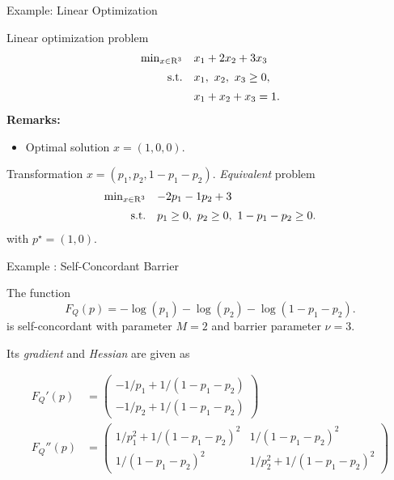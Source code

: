 \documentclass[9pt]{beamer}
\begin{document}
\begin{frame}{Example: Linear Optimization}

  Linear optimization problem
  \[
    \begin{array}{rl}
      \min_{x\in \mathrm{R}^3} & x_1+2x_2+3x_3\\[0.5em]
      \mathrm{s.t.} & x_1,~x_2, ~x_3\geq 0,\\[0.5em]
                        & x_1+x_2+x_3 = 1.
    \end{array}
  \]
  \textbf{Remarks:}
  \begin{itemize}
  \item Optimal solution $x = (1, 0, 0)$.
  \end{itemize}
  
  \vfill
 
  Transformation $x = (p_1, p_2, 1-p_1-p_2)$. \emph{Equivalent} problem
  \[
    \begin{array}{rl}
      \min_{x\in \mathrm{R}^3} & -2p_1-1p_2+3\\[0.5em]
      \mathrm{s.t.} & p_1\geq 0, ~p_2\geq 0, ~1-p_1-p_2\geq 0.
    \end{array}
  \]  
  with $p^\star = (1, 0)$.
\end{frame}

\begin{frame}{Example : Self-Concordant Barrier}

  The function
  \[
    F_Q(p)  = -\log(p_1) - \log(p_2) - \log(1-p_1-p_2).
  \]
  is self-concordant with parameter $M=2$ and barrier parameter $\nu=3$.

  \vfill

  Its \emph{gradient} and \emph{Hessian} are given as
  
  \[
    \begin{array}{rl}
      F_Q'(p) & =
                \begin{pmatrix}
                  -1/p_1+1/(1-p_1-p_2)\\[0.5em]
                  -1/p_2+1/(1-p_1-p_2)
                \end{pmatrix}\\[3em]
      F_Q''(p) & =
                 \begin{pmatrix}
                   1/p^2_1+1/(1-p_1-p_2)^2 &  1/(1-p_1-p_2)^2\\[0.5em]
                   1/(1-p_1-p_2)^2 & 1/p^2_2+1/(1-p_1-p_2)^2
                 \end{pmatrix}
    \end{array}
  \]

\end{frame}
\end{document}
